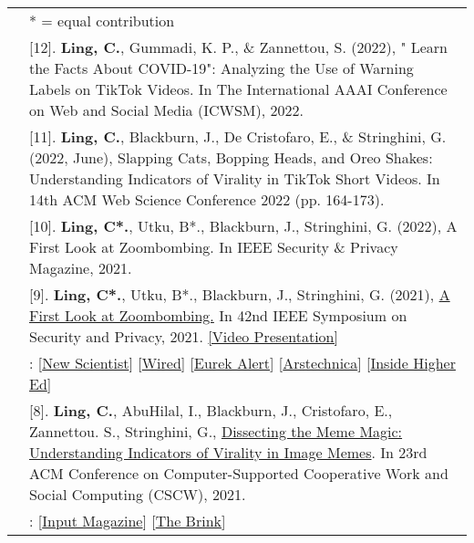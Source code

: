 \documentclass[letterpaper, 11pt]{article}
\begin{document}
\begin{longtable}{p{1.3in}p{4.8in}}
\nohyphens{\color{OliveGreen}{Publications}}
& * = equal contribution\\
&[12]. \textbf{Ling, C.}, Gummadi, K. P., \& Zannettou, S. (2022), " Learn the Facts About COVID-19": Analyzing the Use of Warning Labels on TikTok Videos. In The International AAAI Conference on Web and Social Media (ICWSM), 2022.\\
&[11]. \textbf{Ling, C.}, Blackburn, J., De Cristofaro, E., \& Stringhini, G. (2022, June), Slapping Cats, Bopping Heads, and Oreo Shakes: Understanding Indicators of Virality in TikTok Short Videos. In 14th ACM Web Science Conference 2022 (pp. 164-173).\\
&[10]. \textbf{Ling, C*.}, Utku, B*., Blackburn, J., Stringhini, G. (2022), A First Look at Zoombombing. In IEEE Security \& Privacy Magazine, 2021.\\
&[9]. \textbf{Ling, C*.}, Utku, B*., Blackburn, J., Stringhini, G. (2021), \href{https://arxiv.org/pdf/2009.03822.pdf}{A First Look at Zoombombing.} In 42nd IEEE Symposium on Security and Privacy, 2021. \href{https://www.youtube.com/watch?v=9LSvxtqe38c}{[Video Presentation]}\\
&\color{OliveGreen}{Media Coverage}: [\href{https://www.newscientist.com/article/2255550-most-zoombombing-is-not-done-by-external-hackers-theyre-inside-jobs/}{New Scientist}]
[\href{https://www.wired.com/story/zoombomb-inside-jobs/}{Wired}]
[\href{https://www.eurekalert.org/pub_releases/2021-02/bu-rs020121.php}{Eurek Alert}]
[\href{https://arstechnica.com/information-technology/2021/02/zoombombing-countermeasures-are-ineffective-in-the-vast-majority-of-cases/}{Arstechnica}]
[\href{https://www.insidehighered.com/news/2021/02/17/college-zoombombing-incidents-often-incited-students?utm_source=Inside+Higher+Ed&utm_campaign=8d72a05de8-DNU_2021_COPY_02&utm_medium=email&utm_term=0_1fcbc04421-8d72a05de8-198556833&mc_cid=8d72a05de8&mc_eid=5bccd444e8}{Inside Higher Ed}]\\


&[8]. \textbf{Ling, C.}, AbuHilal, I., Blackburn, J., Cristofaro, E., Zannettou. S., Stringhini, G., 
\href{https://arxiv.org/pdf/2101.06535}{Dissecting the Meme Magic: Understanding Indicators of Virality in Image Memes}. In 23rd ACM Conference on Computer-Supported Cooperative Work and Social Computing (CSCW), 2021.\\
&\color{OliveGreen}{Media Coverage}:
[\href{https://www.inputmag.com/culture/viral-meme-ai-study-bernie-sanders}{Input Magazine}]
[\href{http://www.bu.edu/articles/2021/bernie-sanders-sitting-memes-instant-popularity-explained-by-science/?utm_source=twitter&utm_medium=link&utm_content=research_computerscience&utm_campaign=social_experts}{The Brink}]\\


\end{longtable}
\end{document}
